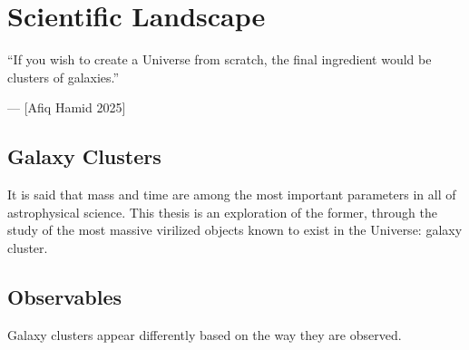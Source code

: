 \chapter[Introduction]{Scientific Landscape}
\label{Chap:Intro}
\epigraph{``If you wish to create a Universe from scratch, the final ingredient would be clusters of galaxies.''}{— [Afiq Hamid 2025]}
\section{Galaxy Clusters}
It is said that mass and time are among the most important parameters in all of astrophysical science. This thesis is an exploration of the former, through the study of the most massive virilized objects known to exist in the Universe: galaxy cluster. 


\section{Observables}

Galaxy clusters appear differently based on the way they are observed.